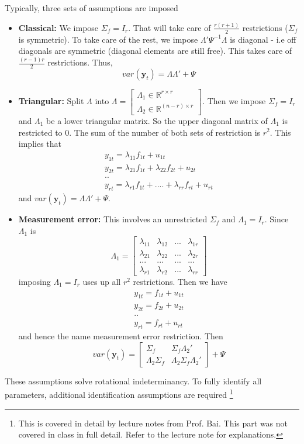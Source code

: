 \documentclass[12pt]{article}
\theoremstyle{definition}
\theoremstyle{property}
\theoremstyle{assumption}
\theoremstyle{example}
\theoremstyle{comment}
\begin{document}
\par
Typically, three sets of assumptions are imposed
\begin{itemize}
\item \textbf{Classical: } We impose $\Sigma_f = I_r$. That will take care of $\frac{r(r+1)}{2}$ restrictions ($\Sigma_f$ is symmetric). To take care of the rest, we impose $\Lambda'\Psi^{-1}\Lambda$ is diagonal - i.e off diagonals are symmetric (diagonal elements are still free). This takes care of $\frac{(r-1)r}{2}$ restrictions. Thus, 
\[
var(\mathbf{y}_t)=\Lambda\Lambda'+\Psi
\]
\item \textbf{Triangular: } Split $\Lambda$ into $\Lambda =\begin{bmatrix}\Lambda_1 \in\mathbb{R}^{r\times r}\\ \Lambda_2 \in\mathbb{R}^{(n-r)\times r}\end{bmatrix}$. Then we impose $\Sigma_f = I_r$ and $\Lambda_1$ be a lower triangular matrix. So the upper diagonal matrix of $\Lambda_1$ is restricted to 0. The sum of the number of both sets of restriction is $r^2$. This implies that
\begin{gather*}
y_{1t}= \lambda_{11}f_{1t}+u_{1t}\\
y_{2t}= \lambda_{21}f_{1t}+\lambda_{22}f_{2t}+u_{2t}\\
..\\
y_{rt}= \lambda_{r1}f_{1t}+....+\lambda_{rr}f_{rt}+u_{rt}
\end{gather*}
and $var(\mathbf{y}_t)=\Lambda\Lambda'+\Psi$. 
\item \textbf{Measurement error: } This involves an unrestricted $\Sigma_f$ and $\Lambda_1 = I_r$. Since $\Lambda_1$ is
\[
\Lambda_1= \begin{bmatrix}\lambda_{11} & \lambda_{12}& ... & \lambda_{1r}\\ \lambda_{21} & \lambda_{22}& ... & \lambda_{2r} \\ ... & ...& ... & ...\\ \lambda_{r1} & \lambda_{r2}& ... & \lambda_{rr}\end{bmatrix}
\]
imposing $\Lambda_1=I_r$ uses up all $r^2$ restrictions. Then we have
\begin{gather*}
y_{1t}= f_{1t}+u_{1t}\\
y_{2t}=f_{2t}+u_{2t}\\
..\\
y_{rt}=f_{rt}+u_{rt}
\end{gather*}
and hence the name measurement error restriction. Then 
\[
var(\mathbf{y}_t)=\begin{bmatrix}\Sigma_f & \Sigma_f\Lambda_2' \\ \Lambda_2\Sigma_f & \Lambda_2 \Sigma_f \Lambda_2' \end{bmatrix} + \Psi
\]
\end{itemize}
These assumptions solve rotational indeterminancy. To fully identify all parameters, additional identification assumptions are required \footnote{This is covered in detail by lecture notes from Prof. Bai. This part was not covered in class in full detail. Refer to the lecture note for explanations. }
\end{document}
